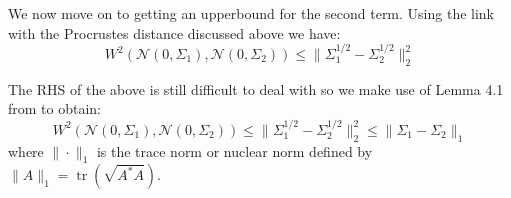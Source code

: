 We now move on to getting an upperbound for the second term. Using the link with the Procrustes distance discussed above we have:
\begin{equation}
    W^2(\mathcal{N}(0,\Sigma_1),\mathcal{N}(0,\Sigma_2))\leq\|\Sigma_{1}^{1/2}-\Sigma_{2}^{1/2}\|_{2}^{2}
\end{equation}

The RHS of the above is still difficult to deal with so we make use of Lemma 4.1 from \textcolor{blue}{\cite{powers1970free}} to obtain:
\begin{equation}
    W^2(\mathcal{N}(0,\Sigma_1),\mathcal{N}(0,\Sigma_2))\leq\|\Sigma_{1}^{1/2}-\Sigma_{2}^{1/2}\|_{2}^{2}\leq\|\Sigma_1-\Sigma_2\|_{1}
\end{equation}
where $\|\cdot\|_1$ is the trace norm or nuclear norm defined by $\|A\|_{1}=\operatorname{tr}(\sqrt{A^{*}A})$.

